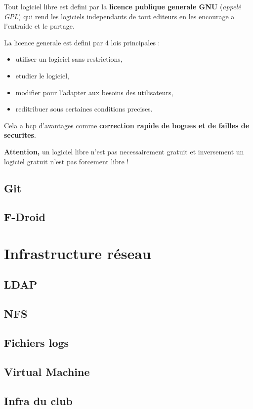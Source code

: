\documentclass[a4paper]{report}
\begin{document}
Tout logiciel libre est defini par la \textbf{licence publique generale GNU} (\textit{appelé GPL}) qui rend les logiciels independants de tout editeurs en les encourage a l'entraide et le partage.

La licence generale est defini par 4 lois principales :
\begin{itemize}
	\item utiliser un logiciel sans restrictions,
	\item etudier le logiciel,
	\item modifier pour l'adapter aux besoins des utilisateurs,
	\item reditribuer sous certaines conditions precises.
\end{itemize}
Cela a bcp d'avantages comme \textbf{correction rapide de bogues et de failles de securites}.

\textbf{Attention,} un logiciel libre n'est pas necessairement gratuit et inversement un logiciel gratuit n'est pas forcement libre ! \newpage

  \section{Git}
    
  \section{F-Droid}
    
    
\chapter{Infrastructure réseau}
  \section{LDAP}
    
  \section{NFS}
    
  \section{Fichiers logs}
    
  \section{Virtual Machine}
    
  \section{Infra du club}
    
\end{document}

